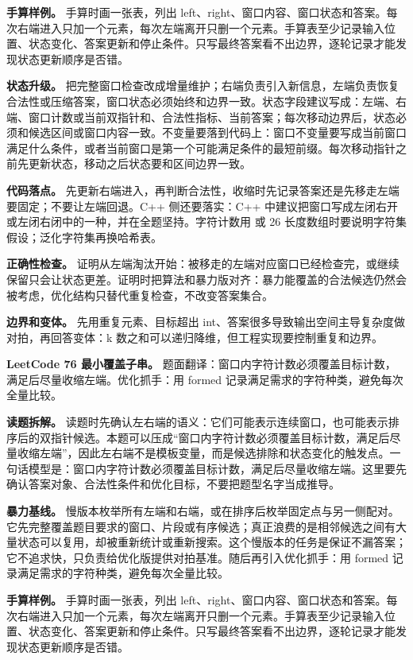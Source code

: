 \textbf{手算样例。} 手算时画一张表，列出 left、right、窗口内容、窗口状态和答案。每次右端进入只加一个元素，每次左端离开只删一个元素。手算表至少记录输入位置、状态变化、答案更新和停止条件。只写最终答案看不出边界，逐轮记录才能发现状态更新顺序是否错。

\textbf{状态升级。} 把完整窗口检查改成增量维护；右端负责引入新信息，左端负责恢复合法性或压缩答案，窗口状态必须始终和边界一致。状态字段建议写成：左端、右端、窗口计数或当前双指针和、合法性指标、当前答案；每次移动边界后，状态必须和候选区间或窗口内容一致。不变量要落到代码上：窗口不变量要写成当前窗口满足什么条件，或者当前窗口是第一个可能满足条件的最短前缀。每次移动指针之前先更新状态，移动之后状态要和区间边界一致。

\textbf{代码落点。} 先更新右端进入，再判断合法性，收缩时先记录答案还是先移走左端要固定；不要让左端回退。C++ 侧还要落实：C++ 中建议把窗口写成左闭右开或左闭右闭中的一种，并在全题坚持。字符计数用  或 26 长度数组时要说明字符集假设；泛化字符集再换哈希表。

\textbf{正确性检查。} 证明从左端淘汰开始：被移走的左端对应窗口已经检查完，或继续保留只会让状态更差。证明时把算法和暴力版对齐：暴力能覆盖的合法候选仍然会被考虑，优化结构只替代重复检查，不改变答案集合。

\textbf{边界和变体。} 先用重复元素、目标超出 int、答案很多导致输出空间主导复杂度做对拍，再回答变体：k 数之和可以递归降维，但工程实现要控制重复和边界。

\noindent\textbf{LeetCode 76 最小覆盖子串。} 题面翻译：窗口内字符计数必须覆盖目标计数，满足后尽量收缩左端。优化抓手：用 formed 记录满足需求的字符种类，避免每次全量比较。

\textbf{读题拆解。} 读题时先确认左右端的语义：它们可能表示连续窗口，也可能表示排序后的双指针候选。本题可以压成“窗口内字符计数必须覆盖目标计数，满足后尽量收缩左端”，因此左右端不是模板变量，而是候选排除和状态变化的触发点。一句话模型是：窗口内字符计数必须覆盖目标计数，满足后尽量收缩左端。这里要先确认答案对象、合法性条件和优化目标，不要把题型名字当成推导。

\textbf{暴力基线。} 慢版本枚举所有左端和右端，或在排序后枚举固定点与另一侧配对。它先完整覆盖题目要求的窗口、片段或有序候选；真正浪费的是相邻候选之间有大量状态可以复用，却被重新统计或重新搜索。这个慢版本的任务是保证不漏答案；它不追求快，只负责给优化版提供对拍基准。随后再引入优化抓手：用 formed 记录满足需求的字符种类，避免每次全量比较。

\textbf{手算样例。} 手算时画一张表，列出 left、right、窗口内容、窗口状态和答案。每次右端进入只加一个元素，每次左端离开只删一个元素。手算表至少记录输入位置、状态变化、答案更新和停止条件。只写最终答案看不出边界，逐轮记录才能发现状态更新顺序是否错。

